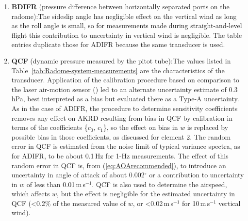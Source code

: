 \documentclass[12pt,twoside,english]{article}\usepackage[]{graphicx}\usepackage[]{color}
\let\OrgIndex\index
\renewcommand*{\index}[1]{\OrgIndex{#1}}
\begin{document}
{{\begin{enumerate}
\item \textbf{BDIFR} (pressure difference between horizontally separated ports on the radome):The sideslip angle has negligible effect on the vertical wind as long as the roll angle is small, so for measurements made during straight-and-level flight this contribution to uncertainty in vertical wind is negligible. The table entries duplicate those for ADIFR because the same transducer is used.
\item \textbf{QCF} (dynamic pressure measured by the pitot tube):The values listed in Table~\ref{tab:Radome-system-measurements} are the characteristics of the transducer. Application of the calibration procedure based on comparison to the laser air-motion sensor (\citet{CooperEtAl2014}) led to an alternate uncertainty estimate of 0.3\,hPa, best interpreted as a bias but evaluated there as a Type-A uncertainty. As in the case of ADIFR, the procedure to determine sensitivity coefficients removes any effect on AKRD resulting from bias in QCF by calibration in terms of the coefficients \{$c_{0},\,c_{1}$\}, so the effect on bias in $w$ is replaced by possible bias in those coefficients, as discussed for element 2. The random error in QCF is estimated from the noise limit of typical variance spectra, as for ADIFR, to be about 0.1\,Hz for 1-Hz measurements. The effect of this random error in QCF is, from (\ref{eq:AOArecommended}), to introduce an uncertainty in angle of attack of about 0.002$^{\circ}$ or a contribution to uncertainty in $w$ of less than 0.01\,m\,s$^{-1}$. QCF is also used to determine the airspeed, which affects $w$, but the effect is negligible for the estimated uncertainty in QCF (<0.2\% of the measured value of $w$, or <0.02\,m\,s$^{-1}$ for 10\,m\,s$^{-1}$ vertical wind).  

\end{enumerate}}}
\end{document}

